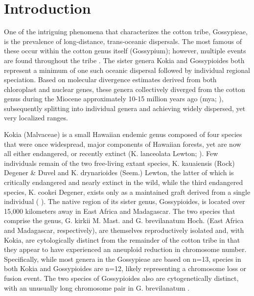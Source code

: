 \documentclass[10pt,letterpaper]{article}
\begin{document}
\section*{Introduction}
One of the intriguing phenomena that characterizes the cotton tribe, Gossypieae,
is the prevalence of long-distance, trans-oceanic dispersals. The most famous of
these occur within the cotton genus itself (Gossypium); however, multiple events
are found throughout the tribe\cite{Dejoode1992} \cite{Fryxell1979}
\cite{Stephens1958} \cite{Stephens1966} \cite{Wendel1989} \cite{Wendel1992}
\cite{Wendel1990} \cite{Wendel1990b}\cite{Wendel2003}\cite{Seelanan1997}. The
sister genera Kokia and Gossypioides both represent a minimum of one such
oceanic dispersal followed by individual regional speciation. Based on molecular
divergence estimates derived from both chloroplast and nuclear genes, these
genera collectively diverged from the cotton genus during the Miocene
approximately 10-15 million years ago (mya; \cite{Seelanan1997}
\cite{Cronn2002}), subsequently splitting into individual genera and achieving
widely dispersed, yet very localized ranges.

Kokia (Malvaceae) is a small Hawaiian endemic genus composed of four species
that were once widespread, major components of Hawaiian forests, yet are now all
either endangered, or recently extinct (K. lanceolata Lewton; \cite{Bates1990}
\cite{Sherwood2014}). Few individuals remain of the two free-living extant
species, K. kauaiensis (Rock) Degener \& Duvel and K. drynarioides (Seem.)
Lewton, the latter of which is critically endangered and nearly extinct in the
wild, while the third endangered species, K. cookei Degener, exists only as a
maintained graft derived from a single individual (\cite{Service2012}
\cite{Sherwood2014}). The native region of its sister genus, Gossypioides, is
located over 15,000 kilometers away in East Africa and Madagascar. The two
species that comprise the genus, G. kirkii M. Mast. and G. brevilanatum Hoch.
(East Africa and Madagascar, respectively), are themselves reproductively
isolated and, with Kokia, are cytologically distinct from the remainder of the
cotton tribe in that they appear to have experienced an aneuploid reduction in
chromosome number. Specifically, while most genera in the Gossypieae are based
on n=13, species in both Kokia and Gossypioides are n=12, likely representing a
chromosome loss or fusion event. The two species of Gossypioides also are
cytogenetically distinct, with an unusually long chromosome pair in G.
brevilanatum \cite{Hutchinson1937} \cite{Hutchinson1943}.
\end{document}
